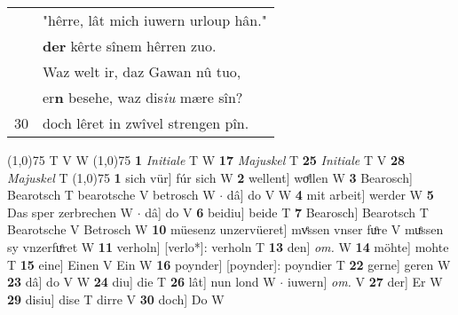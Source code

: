 \documentclass[8pt,a4paper,notitlepage]{article}
\begin{document}
\begin{table}[ht]
\begin{minipage}[t]{0.5\linewidth}
\begin{tabular}{rl}
 & "hêrre, lât mich iuwern urloup hân."\\ 
 & \textbf{der} kêrte sînem hêrren zuo.\\ 
 & Waz welt ir, daz Gawan nû tuo,\\ 
 & er\textbf{n} besehe, waz dis\textit{iu} mære sîn?\\ 
30 & doch lêret in zwîvel strengen pîn.\\ 
\end{tabular}
\scriptsize
\line(1,0){75} \newline
T V W \newline
\line(1,0){75} \newline
\textbf{1} \textit{Initiale} T W  \textbf{17} \textit{Majuskel} T  \textbf{25} \textit{Initiale} T V  \textbf{28} \textit{Majuskel} T  \newline
\line(1,0){75} \newline
\textbf{1} sich vür] fúr sich W \textbf{2} wellent] woͤllen W \textbf{3} Bearosch] Bearotsch T bearotsche V betrosch W  $\cdot$ dâ] do V W \textbf{4} mit arbeit] werder W \textbf{5} Das sper zerbrechen W  $\cdot$ dâ] do V \textbf{6} beidiu] beide T \textbf{7} Bearosch] Bearotsch T Bearotsche V Betrosch W \textbf{10} müesenz unzervüeret] mvͤssen vnser fuͦre V muͤssen sy vnzerfuͤret W \textbf{11} verholn] [verlo*]: verholn T \textbf{13} den] \textit{om.} W \textbf{14} möhte] mohte T \textbf{15} eine] Einen V Ein W \textbf{16} poynder] [poynder]: poyndier T \textbf{22} gerne] geren W \textbf{23} dâ] do V W \textbf{24} diu] die T \textbf{26} lât] nun lond W  $\cdot$ iuwern] \textit{om.} V \textbf{27} der] Er W \textbf{29} disiu] dise T dirre V \textbf{30} doch] Do W \newline
\end{minipage}
\end{table}
\end{document}
